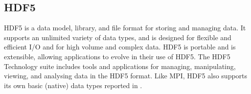 \subsection{HDF5}


HDF5 is a data model, library, and file format for storing and managing data. It supports an unlimited variety of data types, and is designed for flexible and efficient I/O and for high volume and complex data.
HDF5 is portable and is extensible, allowing applications to evolve in their use of HDF5.
The HDF5 Technology suite includes tools and applications for managing, manipulating, viewing, and analysing data in the HDF5 format. Like MPI, HDF5 also supports its own basic (native) data types reported in .

